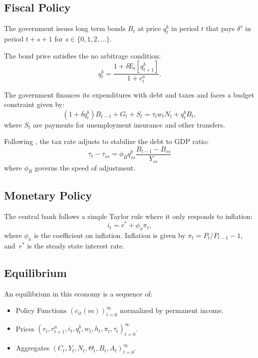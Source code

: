 \documentclass[\econtexRoot/HAFiscal]{subfiles}
\begin{document}
\subsection{Fiscal Policy}

The government issues long term bonds $B_{t}$ at price $q^{b}_{t}$ in period $t$ that pays $\delta^{s}$ in period $t+s+1$ for $s \in \{0,1,2,\ldots\}$.

The bond price satisfies the no arbitrage condition:
$$q^{b}_{t} = \frac{ 1  + \delta \mathrm{E}_{t}[q^{b}_{t+1}]}{1+r^{a}_{t}}.$$ 

The government finances its expenditures with debt and taxes and faces a budget constraint given by: 
$$ (1 + \delta q^{b}_{t})B_{t-1} + G_{t}  + S_{t} = \tau_{t} w_{t} N_{t}+ q^{b}_{t}B_{t},$$
where $S_{t}$ are payments for unemployment insurance and other transfers.

Following \cite{Auclert2020}, the tax rate adjusts to stabilize the debt to GDP ratio:
$$\tau_{t} - \tau_{ss} = \phi_{B} q^{b}_{ss} \frac{B_{t-1} - B_{ss} }{Y_{ss}}$$
where $\phi_{B}$ governs the speed of adjustment. 

\subsection{Monetary Policy}

The central bank follows a simple Taylor rule where it only responds to inflation: 
$$i_{t} = r^{*} +\phi_{\pi} \pi_{t},$$ 
where $\phi_{\pi}$ is the coefficient on inflation. Inflation is given by $\pi_t = P_t/P_{t-1}-1$, and~$r^{*}$ is the steady state interest rate. 

\subsection{Equilibrium}

An equilibrium in this economy is a sequence of: 
\begin{itemize}[label=--]
	\item Policy Functions $\left( c_{it}(m) \right )_{t=0}^{\infty}$ normalized by permanent income.
	\item Prices $ \left(r_{t},  r^{a}_{t+1}, i_{t}, q^{b}_{t},  w_{t}, h_{t} , \pi_{t} , \tau_{t} \right) _{t=0}^{\infty}$.
	\item Aggregates $ \left(C_{t}, Y_{t} , N_{t},   \Theta_{t},  B_{t} , A_{t}  \right)_{t=0}^{\infty}$.
\end{itemize}
\end{document}
